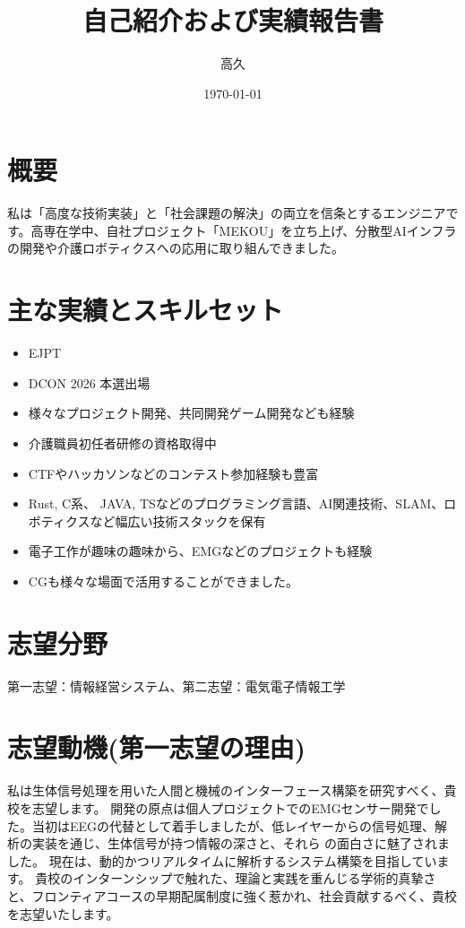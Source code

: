 \documentclass[11pt,a4paper]{ltjsarticle}
\title{\textsf{\huge 自己紹介および実績報告書}}
\author{\large 高久}
\date{\today}
\begin{document}
\maketitle

\section*{概要}
私は「高度な技術実装」と「社会課題の解決」の両立を信条とするエンジニアです。高専在学中、自社プロジェクト「MEKOU」を立ち上げ、分散型AIインフラの開発や介護ロボティクスへの応用に取り組んできました。

\section*{主な実績とスキルセット}
\begin{itemize}
    \item EJPT
    \item DCON 2026 本選出場
    \item 様々なプロジェクト開発、共同開発ゲーム開発なども経験
    \item 介護職員初任者研修の資格取得中
    \item CTFやハッカソンなどのコンテスト参加経験も豊富
    \item Rust, C系、 JAVA, TSなどのプログラミング言語、AI関連技術、SLAM、ロボティクスなど幅広い技術スタックを保有
    \item 電子工作が趣味の趣味から、EMGなどのプロジェクトも経験
    \item CGも様々な場面で活用することができました。
\end{itemize}

\section{志望分野}
第一志望：情報経営システム、第二志望：電気電子情報工学

\section*{志望動機(第一志望の理由)}
私は生体信号処理を用いた人間と機械のインターフェース構築を研究すべく、貴校を志望します。
開発の原点は個人プロジェクトでのEMGセンサー開発でした。当初はEEGの代替として着手しましたが、低レイヤーからの信号処理、解析の実装を通じ、生体信号が持つ情報の深さと、それら
の面白さに魅了されました。
現在は、動的かつリアルタイムに解析するシステム構築を目指しています。
貴校のインターンシップで触れた、理論と実践を重んじる学術的真摯さと、フロンティアコースの早期配属制度に強く惹かれ、社会貢献するべく、貴校を志望いたします。
\end{document}
